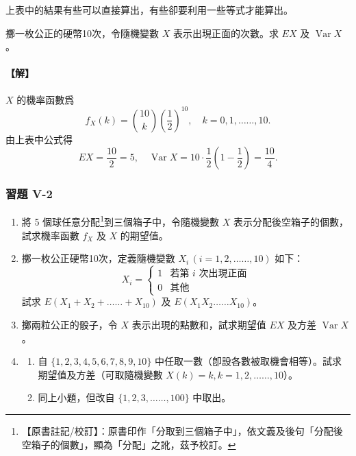 上表中的結果有些可以直接算出，有些卻要利用一些等式才能算出。

\medskip
\begin{example}\label{ex:b5s-5-15}
擲一枚公正的硬幣10次，令隨機變數 $X$ 表示出現正面的次數。求 $EX$ 及 $\operatorname{Var} X$。
\end{example}
\paragraph{【解】}
$X$ 的機率函數爲
\[
f_X(k) = \binom{10}{k} \left(\frac{1}{2}\right)^{10}, \quad k = 0, 1, \ldots\ldots, 10.
\]
由上表中公式得
\[
EX = \frac{10}{2} = 5, \quad \operatorname{Var} X = 10 \cdot \frac{1}{2}\left(1 - \frac{1}{2}\right) = \frac{10}{4}. \tag*{\#}
\]

\subsubsection*{習題 V-2}

\begin{enumerate}[label=\arabic*., leftmargin=2em, itemsep=0.5em]
  \item 將 5 個球任意分配\label{note:b5s-ch5-p160-fenpei}\footnote{【原書註記/校訂】：原書印作「分取到三個箱子中」，依文義及後句「分配後空箱子的個數」，顯為「分配」之訛，茲予校訂。}到三個箱子中，令隨機變數 $X$ 表示分配後空箱子的個數，試求機率函數 $f_X$ 及 $X$ 的期望值。
  \item 擲一枚公正硬幣10次，定義隨機變數 $X_i \, (i = 1, 2, \ldots\ldots, 10)$ 如下：
  \[
  X_i = \begin{cases}
  1 & \text{若第 $i$ 次出現正面} \\
  0 & \text{其他}
  \end{cases}
  \]
  試求 $E(X_1+X_2+\ldots\ldots+X_{10})$ 及 $E(X_1 X_2 \ldots\ldots X_{10})$。
  \item 擲兩粒公正的骰子，令 $X$ 表示出現的點數和，試求期望值 $EX$ 及方差 $\operatorname{Var} X$。
  \item \begin{enumerate}[label=(\arabic*), itemsep=0.3em, topsep=0.2em]
    \item 自 $\{1, 2, 3, 4, 5, 6, 7, 8, 9, 10\}$ 中任取一數（卽設各數被取機會相等）。試求期望值及方差（可取隨機變數 $X(k)=k, k=1, 2, \ldots\ldots, 10$）。
    \item 同上小題，但改自 $\{1, 2, 3, \ldots\ldots, 100\}$ 中取出。
  \end{enumerate}
\end{enumerate}
